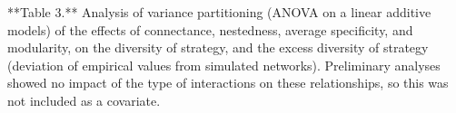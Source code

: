 **Table 3.** Analysis of variance partitioning (ANOVA on a linear additive
models) of the effects of connectance, nestedness, average specificity,
and modularity, on the diversity of strategy, and the excess diversity of
strategy (deviation of empirical values from simulated networks).
Preliminary analyses showed no impact of the type of interactions on these
relationships, so this was not included as a covariate.
